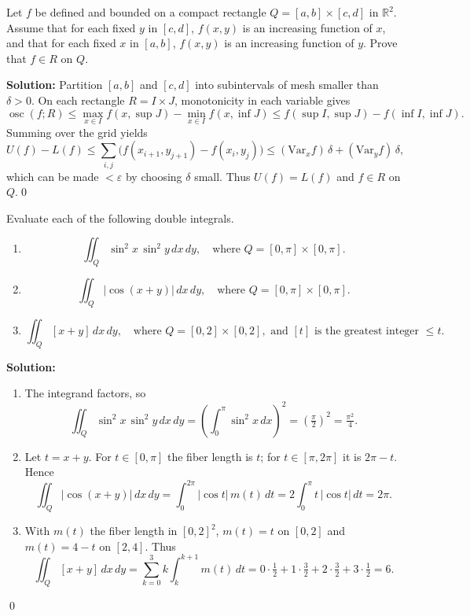 \begin{problembox}
Let \( f \) be defined and bounded on a compact rectangle \( Q = [a, b] \times [c, d] \) in \( \mathbb{R}^2 \). Assume that for each fixed \( y \) in \([c, d]\), \( f(x, y) \) is an increasing function of \( x \), and that for each fixed \( x \) in \([a, b]\), \( f(x, y) \) is an increasing function of \( y \). Prove that \( f \in R \) on \( Q \).
\end{problembox}

\noindent\textbf{Solution:}
Partition $[a,b]$ and $[c,d]$ into subintervals of mesh smaller than $\delta>0$. On each rectangle $R=I\times J$, monotonicity in each variable gives
\[ \operatorname{osc}(f;R) \le \max_{x\in I}\!f(x,\sup J)-\min_{x\in I}\!f(x,\inf J) \le f(\sup I,\sup J)-f(\inf I,\inf J). \]
Summing over the grid yields
\[ U(f)-L(f) \le \sum_{i,j} \big(f(x_{i+1},y_{j+1})-f(x_i,y_j)\big) \le (\text{Var}_x f)\,\delta + (\text{Var}_y f)\,\delta, \]
which can be made $<\varepsilon$ by choosing $\delta$ small. Thus $U(f)=L(f)$ and $f\in R$ on $Q$.\qed


\begin{problembox}
Evaluate each of the following double integrals.
\begin{enumerate}[label=(\alph*)]
    \item \[ \iint_{Q} \sin^2 x \, \sin^2 y \, dx \, dy, \quad \text{where } Q = [0, \pi] \times [0, \pi]. \]
    \item \[ \iint_{Q} |\cos (x + y)| \, dx \, dy, \quad \text{where } Q = [0, \pi] \times [0, \pi]. \]
    \item \[ \iint_{Q} [x + y] \, dx \, dy, \quad \text{where } Q = [0, 2] \times [0, 2], \text{ and } [t] \text{ is the greatest integer } \leq t. \]
\end{enumerate}
\end{problembox}

\noindent\textbf{Solution:}
\begin{enumerate}[label=(\alph*)]
    \item The integrand factors, so
    \[ \iint_Q \sin^2 x\,\sin^2 y\,dx\,dy = \left(\int_0^{\pi} \sin^2 x\,dx\right)^2 = \left(\tfrac{\pi}{2}\right)^2 = \tfrac{\pi^2}{4}. \]
    \item Let $t=x+y$. For $t\in[0,\pi]$ the fiber length is $t$; for $t\in[\pi,2\pi]$ it is $2\pi-t$. Hence
    \[ \iint_Q |\cos(x+y)|\,dx\,dy = \int_0^{2\pi} |\cos t|\,m(t)\,dt = 2\int_0^{\pi} t\,|\cos t|\,dt = 2\pi. \]
    \item With $m(t)$ the fiber length in $[0,2]^2$, $m(t)=t$ on $[0,2]$ and $m(t)=4-t$ on $[2,4]$. Thus
    \[ \iint_Q [x+y]\,dx\,dy = \sum_{k=0}^3 k\int_k^{k+1} m(t)\,dt = 0\cdot\tfrac{1}{2} + 1\cdot\tfrac{3}{2} + 2\cdot\tfrac{3}{2} + 3\cdot\tfrac{1}{2} = 6. \]
\end{enumerate}\qed


